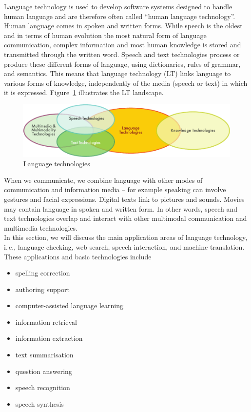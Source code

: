 \clearpage


\begin{multicols}{2}


Language technology is used to develop software systems designed to handle human language and are therefore often called “human language technology”. Human language comes in spoken and written forms. While speech is the oldest and in terms of human evolution the most natural form of language communication, complex information and most human knowledge is stored and transmitted through the written word. Speech and text technologies process or produce these different forms of language, using dictionaries, rules of grammar, and semantics. This means that language technology (LT) links language to various forms of knowledge, independently of the media (speech or text) in which it is expressed. Figure~\ref{fig:ltincontext_en} illustrates the LT landscape.

\begin{figure}[htb]
  \center
  \includegraphics[width=\textwidth]{../_media/english/language_technologies}
  \caption{Language technologies}
  \label{fig:ltincontext_en}
\end{figure}

When we communicate, we combine language with other modes of communication and information media – for example speaking can involve gestures and facial expressions. Digital texts link to pictures and sounds. Movies may contain language in spoken and written form. In other words, speech and text technologies overlap and interact with other multimodal communication and multimedia technologies.\\ 
In this section, we will discuss the main application areas of language technology, i.\,e., language checking, web search, speech interaction, and machine translation. These applications and basic technologies include

\begin{itemize}
\item spelling correction
\item authoring support
\item computer-assisted language learning
\item information retrieval 
\item information extraction
\item text summarisation
\item question answering
\item speech recognition 
\item speech synthesis 
\end{itemize}


\end{multicols}
